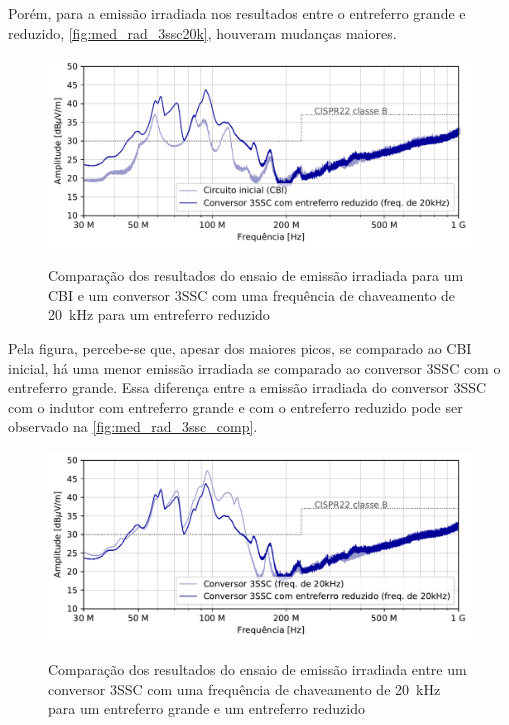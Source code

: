     Porém, para a emissão irradiada nos resultados entre o entreferro grande e reduzido, \autoref{fig:med_rad_3ssc20k}, houveram mudanças maiores. 
    
    \begin{figure}[H]
    	\centering
    	\caption{Comparação dos resultados do ensaio de emissão irradiada para um CBI e um conversor 3SSC com uma frequência de chaveamento de \SI{20}{\kilo\hertz} para um entreferro reduzido}
    	\includegraphics[scale=.9]{pdf/rad/Conversor 3SSC com entreferro reduzido (freq. de 20kHz).pdf}
    	\label{fig:med_rad_3ssc20k}
    \end{figure}
    
    Pela figura, percebe-se que, apesar dos maiores picos, se comparado ao CBI inicial, há uma menor emissão irradiada se comparado ao conversor 3SSC com o entreferro grande. Essa diferença entre a emissão irradiada do conversor 3SSC com o indutor com entreferro grande e com o entreferro reduzido pode ser observado na \autoref{fig:med_rad_3ssc_comp}. 
    
    \begin{figure}[H]
    	\centering
    	\caption{Comparação dos resultados do ensaio de emissão irradiada entre um conversor 3SSC com uma frequência de chaveamento de \SI{20}{\kilo\hertz} para um entreferro grande e um entreferro reduzido}
    	\includegraphics[scale=.9]{pdf/rad/rad-Conversor 3SSC (freq. de 20kHz)-Conversor 3SSC com entreferro reduzido (freq. de 20kHz).pdf}
    	\label{fig:med_rad_3ssc_comp}
    \end{figure}
    
